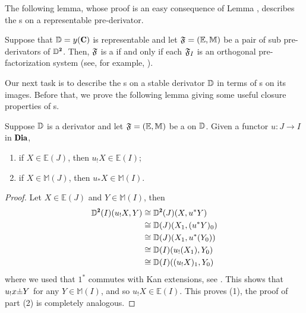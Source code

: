 The following lemma, whose proof is an easy consequence of Lemma , describes the {\cpfs}s on a representable pre-derivator.

\begin{lemma}\label{dpfs=pfs_if_discrete}
Suppose that $\D=y(\C)$ is representable and let $\mathfrak{F}=(\mathbb E,\mathbb M)$ be a pair of sub pre-derivators of $\D^\due$. Then, $\mathfrak{F}$ is a \cpfs if and only if each $\mathfrak{F}_I$ is an orthogonal pre-factorization system (see, for example, \cite[§\textbf{1}]{riehl2008factorization}).
\end{lemma}

Our next task is to describe the {\cpfs}s on a stable derivator $\mathbb{D}$ in terms of {\phfs}s on its images. Before that, we prove the following lemma giving some useful closure properties of {\cpfs}s.


\begin{lemma}\label{cfs_limit_colimit}
Suppose $\mathbb{D}$ is a derivator and let $\mathfrak{F}=(\mathbb E,\mathbb M)$ be a \cpfs on $\mathbb{D}$. Given a functor $u\colon J\to I$ in $\Dia$, 
\begin{enumerate}
\item if $X\in \mathbb E(J)$, then $u_!X\in \mathbb E(I)$;
\item if $X\in \mathbb M(J)$, then $u_*X\in \mathbb M(I)$.
\end{enumerate}
\end{lemma}
\begin{proof}
Let $X\in \mathbb E(J)$ and $Y\in \mathbb M(I)$, then
\begin{align*}\D^\due(I)(u_!X,Y)&\cong \D^\due(J)(X,u^*Y)\\
&\cong \D(J)(X_1,(u^*Y)_0)\\
&\cong \D(J)(X_1,u^*(Y_0))\\
&\cong \D(I)(u_!(X_1),Y_0)\\
&\cong \D(I)((u_!X)_1,Y_0)
\end{align*}
where we used that $1^*$ commutes with Kan extensions, see \cite[\aprop\textbf{2.6}]{Moritz}. This shows that $u_!x{\corth }Y$ for any $Y\in\mathbb M(I)$, and so $u_!X\in \mathbb E(I)$. This proves (1), the proof of part (2) is completely analogous.
\end{proof}


